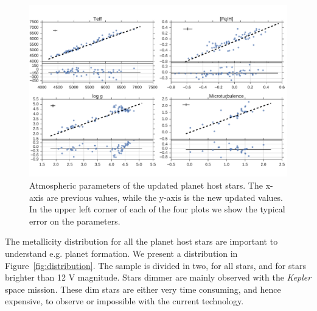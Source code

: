 \documentclass{aa}
\begin{document}
\begin{figure}[tpb]
    \centering
    \includegraphics[width=1.0\linewidth,natwidth=870,natheight=580]{figures/update.pdf}
    \caption{Atmospheric parameters of the updated planet host stars. The x-axis
    are previous values, while the y-axis is the new updated values. In the
    upper left corner of each of the four plots we show the typical error
    on the parameters.}
    \label{fig:update}
\end{figure}

The metallicity distribution for all the planet host stars are important to
understand e.g. planet formation. We present a distribution in
Figure~\ref{fig:distribution}. The sample is divided in two, for all stars, and
for stars brighter than 12 V magnitude. Stars dimmer are mainly observed with
the \emph{Kepler} space mission. These dim stars are either very time consuming,
and hence expensive, to observe or impossible with the current technology.
\end{document}
